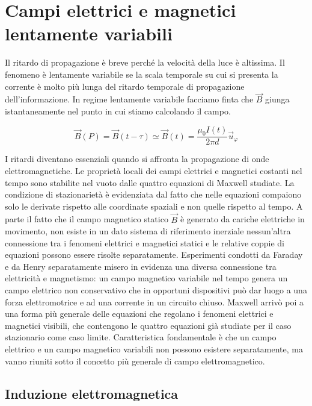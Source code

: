 \chapter{Campi elettrici e magnetici lentamente variabili}

Il ritardo di propagazione è breve perché la velocità della luce è altissima. Il fenomeno è lentamente variabile se la scala temporale su cui si presenta la corrente è molto più lunga del ritardo temporale di propagazione dell'informazione. In regime lentamente variabile facciamo finta che $\vec{B}$ giunga istantaneamente nel punto in cui stiamo calcolando il campo.

\[
	\vec{B} (P)=\vec{B} (t-\tau) \simeq \vec{B} (t)=\frac{\mu_0 I(t)}{2\pi d}\vec{u}_{\varphi}
\]

I ritardi diventano essenziali quando si affronta la propagazione di onde elettromagnetiche.
Le proprietà locali dei campi elettrici e magnetici costanti nel tempo sono stabilite nel vuoto dalle quattro equazioni di Maxwell studiate. La condizione di stazionarietà è evidenziata dal fatto che nelle equazioni compaiono solo le derivate rispetto alle coordinate spaziali e non quelle rispetto al tempo. A parte il fatto che il campo magnetico statico $\vec{B}$ è generato da cariche elettriche in movimento, non esiste in un dato sistema di riferimento inerziale nessun'altra connessione tra i fenomeni elettrici e magnetici statici e le relative coppie di equazioni possono essere risolte separatamente. Esperimenti condotti da Faraday e da Henry separatamente misero in evidenza una diversa connessione tra elettricità e magnetismo: un campo magnetico variabile nel tempo genera un campo elettrico non conservativo che in opportuni dispositivi può dar luogo a una forza elettromotrice e ad una corrente in un circuito chiuso. Maxwell arrivò poi a una forma più generale delle equazioni che regolano i fenomeni elettrici e magnetici visibili, che contengono le quattro equazioni già studiate per il caso stazionario come caso limite. Caratteristica fondamentale è che un campo elettrico e un campo magnetico variabili non possono esistere separatamente, ma vanno riuniti sotto il concetto più generale di campo elettromagnetico.

\section{Induzione elettromagnetica}

